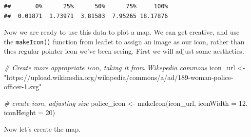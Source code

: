 \documentclass[
  krantz2]{krantz}
\makeatletter
\newenvironment{Shaded}{\begin{snugshade}}{\end{snugshade}}
\newcommand{\AttributeTok}[1]{\textcolor[rgb]{0.61,0.61,0.61}{#1}}
\newcommand{\CommentTok}[1]{\textcolor[rgb]{0.37,0.37,0.37}{\textit{#1}}}
\newcommand{\ConstantTok}[1]{\textcolor[rgb]{0,0,0}{#1}}
\newcommand{\DecValTok}[1]{\textcolor[rgb]{0.06,0.06,0.06}{#1}}
\newcommand{\FloatTok}[1]{\textcolor[rgb]{0.06,0.06,0.06}{#1}}
\newcommand{\FunctionTok}[1]{\textcolor[rgb]{0,0,0}{#1}}
\newcommand{\NormalTok}[1]{#1}
\newcommand{\OtherTok}[1]{\textcolor[rgb]{0.37,0.37,0.37}{#1}}
\newcommand{\SpecialCharTok}[1]{\textcolor[rgb]{0,0,0}{#1}}
\newcommand{\StringTok}[1]{\textcolor[rgb]{0.5,0.5,0.5}{#1}}
\newenvironment{kframe}{%
\medskip{}
\setlength{\fboxsep}{.8em}
 \def\at@end@of@kframe{}%
 \ifinner\ifhmode%
  \def\at@end@of@kframe{\end{minipage}}%
  \begin{minipage}{\columnwidth}%
 \fi\fi%
 \def\FrameCommand##1{\hskip\@totalleftmargin \hskip-\fboxsep
 \colorbox{shadecolor}{##1}\hskip-\fboxsep
     \hskip-\linewidth \hskip-\@totalleftmargin \hskip\columnwidth}%
 \MakeFramed {\advance\hsize-\width
   \@totalleftmargin\z@ \linewidth\hsize
   \@setminipage}}%
 {\par\unskip\endMakeFramed%
 \at@end@of@kframe}
\renewenvironment{Shaded}{\begin{kframe}}{\end{kframe}}
\makeatother
\begin{document}
\begin{verbatim}
##       0%      25%      50%      75%     100% 
##  0.01871  1.73971  3.81583  7.95265 18.17876
\end{verbatim}

Now we are ready to use this data to plot a map. We can get creative, and use the \texttt{makeIcon()} function from leaflet to assign an image as our icon, rather than thes regular pointer icon we've been seeing. First we will adjust some aesthetics.

\begin{Shaded}
\begin{Highlighting}[]
\CommentTok{\# Create more appropriate icon, taking it from Wikepedia commons }
\NormalTok{icon\_url }\OtherTok{\textless{}{-}} \StringTok{"https://upload.wikimedia.org/wikipedia/commons/a/ad/189{-}woman{-}police{-}officer{-}1.svg"}

\CommentTok{\# create icon, adjusting size }
\NormalTok{police\_icon }\OtherTok{\textless{}{-}} \FunctionTok{makeIcon}\NormalTok{(icon\_url,}
                        \AttributeTok{iconWidth =} \DecValTok{12}\NormalTok{, }
                        \AttributeTok{iconHeight =} \DecValTok{20}\NormalTok{)}
\end{Highlighting}
\end{Shaded}

\begin{Shaded}
\end{Shaded}

Now let's create the map.
\end{document}
